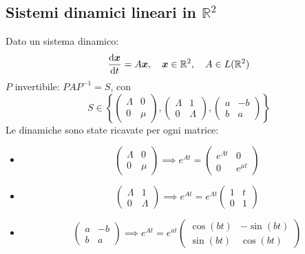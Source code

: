 \subsection{Sistemi dinamici lineari in $\mathbb{R}^2$}%
Dato un sistema dinamico:
\[
    \frac{\text{d} \boldsymbol{x}}{\text{d} t} =A\boldsymbol{x}, \quad \boldsymbol{x}\in \mathbb{R}^2, \quad A \in L(\mathbb{R}^2)
\] 
$P$  invertibile: $PAP^{-1}= S$, con 
\[
    S \in \left\{\begin{pmatrix} \Lambda  & 0 \\ 0 & \mu \end{pmatrix}, \begin{pmatrix} \Lambda  & 1 \\ 0 & \Lambda \end{pmatrix}, 
    \begin{pmatrix} a & -b \\ b & a \end{pmatrix} \right\}
\] 
Le dinamiche sono state ricavate per ogni matrice:
\begin{itemize}
    \item 
	\[
	    \begin{pmatrix} \Lambda  & 0 \\ 0 & \mu \end{pmatrix} \implies  e^{At} = \begin{pmatrix} e^{\Lambda t} & 0 \\ 0 & e^{\mu t} \end{pmatrix} 
	\] 
    \item 
	\[
	    \begin{pmatrix} \Lambda  & 1 \\ 0 & \Lambda \end{pmatrix} \implies  e^{At} = e^{\Lambda t}\begin{pmatrix} 1 & t \\ 0 & 1 \end{pmatrix} 
	\] 
    \item 
	\[
	    \begin{pmatrix} a & -b \\ b & a \end{pmatrix} \implies  e^{At} = e^{at} \begin{pmatrix} \cos (bt) & -\sin (bt) \\ \sin (bt) & \cos (bt) \end{pmatrix}
	\] 
\end{itemize}
